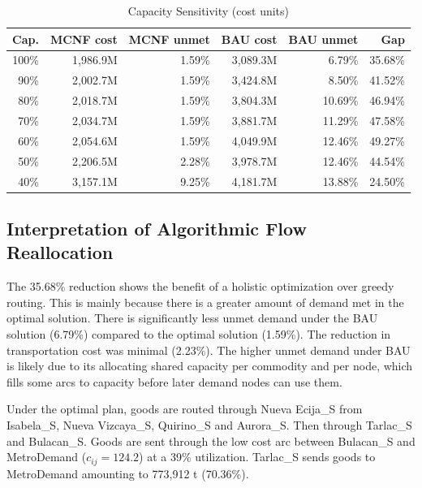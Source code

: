 \documentclass{icsthesis}
\begin{document}
\begin{mainmatter}
\begin{table}[htbp]
\caption{Capacity Sensitivity (cost units)}
\centering
\small
\setlength{\tabcolsep}{2pt}
\begin{tabular}{rrrrrr}
\hline
Cap. & MCNF cost & MCNF unmet & BAU cost & BAU unmet & Gap \\
\hline
100\% & 1,986.9M & 1.59\% & 3,089.3M & 6.79\% & 35.68\% \\
90\% & 2,002.7M & 1.59\% & 3,424.8M & 8.50\% & 41.52\% \\
80\% & 2,018.7M & 1.59\% & 3,804.3M & 10.69\% & 46.94\% \\
70\% & 2,034.7M & 1.59\% & 3,881.7M & 11.29\% & 47.58\% \\
60\% & 2,054.6M & 1.59\% & 4,049.9M & 12.46\% & 49.27\% \\
50\% & 2,206.5M & 2.28\% & 3,978.7M & 12.46\% & 44.54\% \\
40\% & 3,157.1M & 9.25\% & 4,181.7M & 13.88\% & 24.50\% \\
\hline
\end{tabular}
\end{table}

\newpage

\subsection{Interpretation of Algorithmic Flow Reallocation}
The 35.68\% reduction shows the benefit of a holistic optimization over greedy routing. This is mainly because there is a greater amount of demand met in the optimal solution. There is significantly less unmet demand under the BAU solution (6.79\%) compared to the optimal solution (1.59\%). The reduction in transportation cost was minimal (2.23\%). The higher unmet demand under BAU is likely due to its allocating shared capacity per commodity and per node, which fills some arcs to capacity before later demand nodes can use them.

Under the optimal plan, goods are routed through Nueva Ecija\_S from Isabela\_S, Nueva Vizcaya\_S, Quirino\_S and Aurora\_S. Then through Tarlac\_S and Bulacan\_S. Goods are sent through the low cost arc between Bulacan\_S and MetroDemand ($c_{ij}=124.2$) at a 39\% utilization. Tarlac\_S sends goods to MetroDemand amounting to 773,912 t (70.36\%).


\end{mainmatter}
\end{document}
